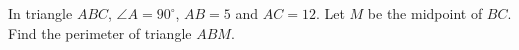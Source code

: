 In triangle $ABC$, $\angle A=90^\circ$, $AB=5$ and $AC=12$. Let $M$ be the midpoint of $BC$. Find the perimeter of triangle $ABM$.

